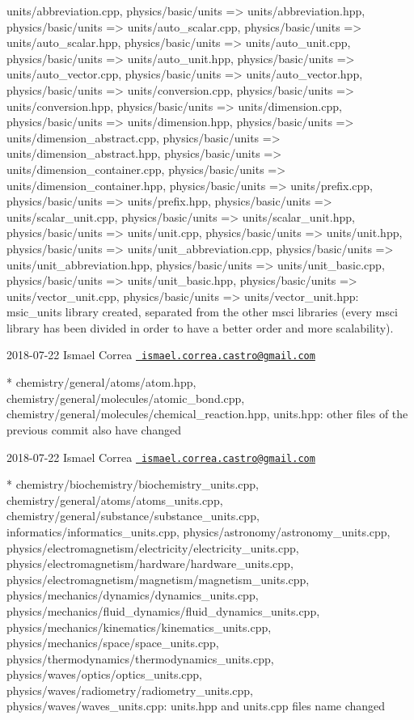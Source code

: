 \begin{DoxyVerb}
{units}/abbreviation.cpp, {physics/basic/units =>
units}/abbreviation.hpp, {physics/basic/units =>
units}/auto_scalar.cpp, {physics/basic/units =>
units}/auto_scalar.hpp, {physics/basic/units =>
units}/auto_unit.cpp, {physics/basic/units => units}/auto_unit.hpp,
{physics/basic/units => units}/auto_vector.cpp,
{physics/basic/units => units}/auto_vector.hpp,
{physics/basic/units => units}/conversion.cpp, {physics/basic/units
=> units}/conversion.hpp, {physics/basic/units =>
units}/dimension.cpp, {physics/basic/units => units}/dimension.hpp,
{physics/basic/units => units}/dimension_abstract.cpp,
{physics/basic/units => units}/dimension_abstract.hpp,
{physics/basic/units => units}/dimension_container.cpp,
{physics/basic/units => units}/dimension_container.hpp,
{physics/basic/units => units}/prefix.cpp, {physics/basic/units =>
units}/prefix.hpp, {physics/basic/units => units}/scalar_unit.cpp,
{physics/basic/units => units}/scalar_unit.hpp,
{physics/basic/units => units}/unit.cpp, {physics/basic/units =>
units}/unit.hpp, {physics/basic/units =>
units}/unit_abbreviation.cpp, {physics/basic/units =>
units}/unit_abbreviation.hpp, {physics/basic/units =>
units}/unit_basic.cpp, {physics/basic/units =>
units}/unit_basic.hpp, {physics/basic/units =>
units}/vector_unit.cpp, {physics/basic/units =>
units}/vector_unit.hpp: msic_units library created, separated from
the other msci libraries (every msci library has been divided in
order to have a better order and more scalability).
\end{DoxyVerb}
 2018-\/07-\/22 Ismael Correa \href{mailto:ismael.correa.castro@gmail.com}{\texttt{ ismael.\+correa.\+castro@gmail.\+com}} \begin{DoxyVerb}* chemistry/general/atoms/atom.hpp,
chemistry/general/molecules/atomic_bond.cpp,
chemistry/general/molecules/chemical_reaction.hpp, units.hpp: other
files of the previous commit also have changed
\end{DoxyVerb}
 2018-\/07-\/22 Ismael Correa \href{mailto:ismael.correa.castro@gmail.com}{\texttt{ ismael.\+correa.\+castro@gmail.\+com}} \begin{DoxyVerb}* chemistry/biochemistry/biochemistry_units.cpp,
chemistry/general/atoms/atoms_units.cpp,
chemistry/general/substance/substance_units.cpp,
informatics/informatics_units.cpp,
physics/astronomy/astronomy_units.cpp,
physics/electromagnetism/electricity/electricity_units.cpp,
physics/electromagnetism/hardware/hardware_units.cpp,
physics/electromagnetism/magnetism/magnetism_units.cpp,
physics/mechanics/dynamics/dynamics_units.cpp,
physics/mechanics/fluid_dynamics/fluid_dynamics_units.cpp,
physics/mechanics/kinematics/kinematics_units.cpp,
physics/mechanics/space/space_units.cpp,
physics/thermodynamics/thermodynamics_units.cpp,
physics/waves/optics/optics_units.cpp,
physics/waves/radiometry/radiometry_units.cpp,
physics/waves/waves_units.cpp: units.hpp and units.cpp files name
changed
\end{DoxyVerb}
